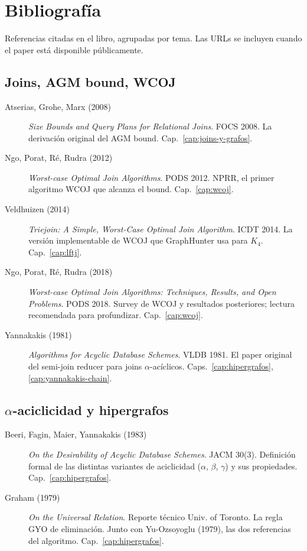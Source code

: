 \chapter{Bibliografía}
\label{ap:bibliografia}

Referencias citadas en el libro, agrupadas por tema. Las URLs se
incluyen cuando el paper está disponible públicamente.

\section*{Joins, AGM bound, WCOJ}

\begin{description}
    \item[Atserias, Grohe, Marx (2008)] \emph{Size Bounds and Query
    Plans for Relational Joins}. FOCS 2008. La derivación
    original del AGM bound. Cap.~\ref{cap:joins-y-grafos}.

    \item[Ngo, Porat, R\'e, Rudra (2012)] \emph{Worst-case Optimal
    Join Algorithms}. PODS 2012. NPRR, el primer algoritmo WCOJ
    que alcanza el bound. Cap.~\ref{cap:wcoj}.

    \item[Veldhuizen (2014)] \emph{Triejoin: A Simple,
    Worst-Case Optimal Join Algorithm}. ICDT 2014. La versión
    implementable de WCOJ que GraphHunter usa para \(K_4\).
    Cap.~\ref{cap:lftj}.

    \item[Ngo, Porat, R\'e, Rudra (2018)] \emph{Worst-case Optimal
    Join Algorithms: Techniques, Results, and Open Problems}. PODS
    2018. Survey de WCOJ y resultados posteriores; lectura
    recomendada para profundizar. Cap.~\ref{cap:wcoj}.

    \item[Yannakakis (1981)] \emph{Algorithms for Acyclic Database
    Schemes}. VLDB 1981. El paper original del semi-join reducer
    para joins \(\alpha\)-acíclicos. Caps.~\ref{cap:hipergrafos},
    \ref{cap:yannakakis-chain}.
\end{description}

\section*{\(\alpha\)-aciclicidad y hipergrafos}

\begin{description}
    \item[Beeri, Fagin, Maier, Yannakakis (1983)] \emph{On the
    Desirability of Acyclic Database Schemes}. JACM 30(3). Definición
    formal de las distintas variantes de aciclicidad
    (\(\alpha\), \(\beta\), \(\gamma\)) y sus propiedades.
    Cap.~\ref{cap:hipergrafos}.

    \item[Graham (1979)] \emph{On the Universal Relation}. Reporte
    técnico Univ. of Toronto. La regla GYO de eliminación. Junto
    con Yu-Ozsoyoglu (1979), las dos referencias del algoritmo.
    Cap.~\ref{cap:hipergrafos}.
\end{description}

